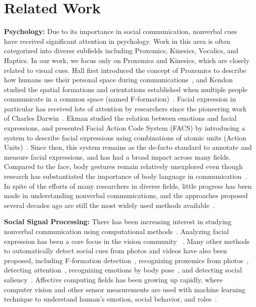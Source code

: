 \section{Related Work}

\textbf{Psychology:}
Due to its importance in social communication, nonverbal cues have received significant attention in psychology. Work in this area is often categorized into diverse subfields including Proxemics, Kinesics, Vocalics, and Haptics. In our work, we focus only on Proxemics and Kinesics, which are closely related to visual cues. Hall first introduced the concept of Proxemics to describe how humans use their personal space during communications~\cite{Hall66}, and Kendon studied the spatial formations and orientations established when multiple people communicate in a common space (named F-formation)~\cite{kendon90}. Facial expression in particular has received lots of attention by researchers since the pioneering work of Charles Darwin~\cite{Darwin-1872}. Ekman studied the relation between emotions and facial expressions, and presented Facial Action Code System (FACS) by introducing a system to describe facial expressions using combinations of atomic units (Action Units)~\cite{ekman1977facial}. Since then, this system remains as the de-facto standard to annotate and measure facial expressions, and has had a broad impact across many fields. Compared to the face, body gestures remain relatively unexplored even though research has substantiated the importance of body language in communication~\cite{Gelder09, Moore13, Meeren-2005, Aviezer-2012}. In spite of the efforts of many researchers in diverse fields, little progress has been made in understanding nonverbal communications, and the approaches proposed several decades ago are still the most widely used methods available~\cite{Moore13}. %







\textbf{Social Signal Processing:}
There has been increasing interest in studying nonverbal communication using computational methods~\cite{vinciarelli2009social, vinciarelli2012bridging}. Analyzing facial expression has been a core focus in the vision community ~\cite{ChuDC13, Torre15, shan2009facial}. Many other methods to automatically detect social cues from photos and videos have also been proposed, including F-formation detection~\cite{setti2015f}, recognizing proxemics from photos~\cite{yang2012recognizing}, detecting attention~\cite{Fathi-2012}, recognizing emotions by body pose~\cite{schindler2008recognizing}, and detecting social saliency~\cite{park20123d}. Affective computing fields has been growing up rapidly, where computer vision and other sensor measurements are used with machine learning technique to understand human's emotion, social behavior, and roles~\cite{picard1997affective}. 

